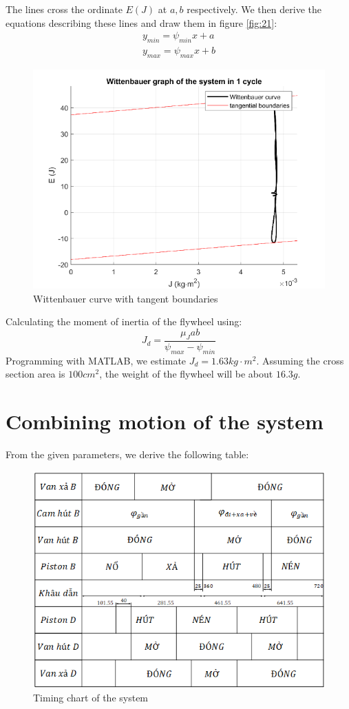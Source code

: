 The lines cross the ordinate $ E(J) $ at $ a, b $ respectively. We then derive the equations describing these lines and draw them in figure \ref{fig:21}:
\begin{equation}
	\begin{array}{c}
	y_{min}=\psi_{min} x + a\\
	y_{max}=\psi_{max} x + b
	\end{array}
\end{equation}
\begin{figure}
	\centering
	\includegraphics[width=0.6\linewidth]{22}
	\caption{Wittenbauer curve with tangent boundaries}
	\label{fig:22}
\end{figure}
Calculating the moment of inertia of the flywheel using:
\begin{equation}
	J_d=\dfrac{\mu_J ab}{\psi_{max}-\psi_{min}}
\end{equation}
Programming with MATLAB\textup{\textregistered}, we estimate $ J_d=1.63\unit{kg\cdot m^2} $. Assuming the cross section area is $ 100\unit{cm^2} $, the weight of the flywheel will be about $ 16.3\unit{g} $.
\section{Combining motion of the system}
From the given parameters, we derive the following table:
\begin{figure}[h]
	\centering
	\includegraphics[width=0.6\linewidth]{23}
	\caption{Timing chart of the system}
	\label{fig:23}
\end{figure}
